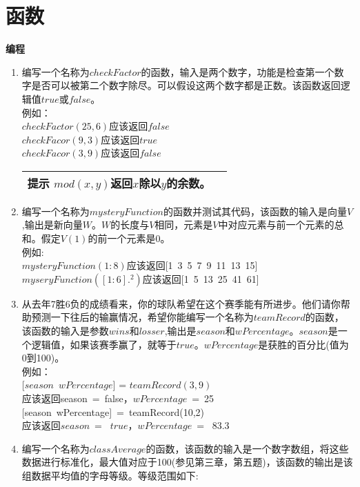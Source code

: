 \documentclass[UTF8]{ctexart}
\begin{document}
\section{函数}
\textbf{编程}
\begin{enumerate}
	\item 编写一个名称为$checkFactor$的函数，输入是两个数字，功能是检查第一个数字是否可以被第二个数字除尽。可以假设这两个数字都是正数。该函数返回逻辑值$true$或$false$。\\
	\text{\qquad}例如：
	\\ \text{\qquad}$checkFactor(25,6)$应该返回$false$\\ \text{\qquad}$checkFacor(9,3)$应该返回$true$\\ \text{\qquad}$checkFacor(3,9)$应该返回$false$\\
	\begin{table}[H]
		\centering
		\begin{tabular}{|p{10cm}|l|}
			\hline
			\textbf{提示} \qquad $mod(x,y)$返回$x$除以$y$的余数。\\
			\hline
		\end{tabular}
	\end{table}
\item 编写一个名称为$mysteryFunction$的函数并测试其代码，该函数的输入是向量$V$,输出是新向量$W$。$W$的长度与$V$相同，元素是$V$中对应元素与前一个元素的总和。假定$V(1)$的前一个元素是0。\\
\text{\qquad}例如:\\ \text{\qquad} $mysteryFunction(1:8)$应该返回[1\ 3\ 5\ 7\ 9\ 11\ 13\ 15]\\
\text{\qquad}$myseryFunction([1:6].^2)$应该返回[1\ 5\ 13\ 25\ 41\ 61]
\item 从去年7胜6负的成绩看来，你的球队希望在这个赛季能有所进步。他们请你帮助预测一下往后的输赢情况，希望你能编写一个名称为$teamRecord$的函数，该函数的输入是参数$wins$和$losser$,输出是$season$和$wPercentage$。$season$是一个逻辑值，如果该赛季赢了，就等于$true$。$wPercentage$是获胜的百分比(值为0到100)。\\
\text{\qquad} 例如：\\
\text{\qquad \qquad} [$season$\ $wPercentage$] = $teamRecord(3,9)$\\
\text{\qquad \qquad} 应该返回season\ =\ false，$wPercentage$\ =\ 25
\text{\qquad \qquad}[season\ wPercentage]\ =\ teamRecord(10,2)\\
\text{\qquad \qquad}应该返回$season$\ = \ $true$，$wPercentage$\ = \ 83.3
\item 编写一个名称为$classAverage$的函数，该函数的输入是一个数字数组，将这些数据进行标准化，最大值对应于100(参见第三章，第五题)，该函数的输出是该组数据平均值的字母等级。等级范围如下:\\

\end{enumerate}
\end{document}
